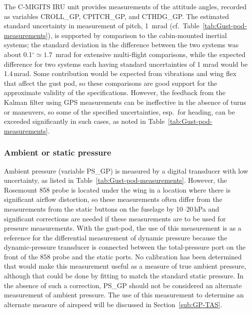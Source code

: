 \documentclass[12pt,twoside,english]{article}\usepackage[]{graphicx}\usepackage[]{color}
\let\OrgIndex\index
\renewcommand*{\index}[1]{\OrgIndex{#1}}
\begin{document}
The C-MIGITS  IRU unit provides measurements of the attitude angles, recorded as variables CROLL\_GP, CPITCH\_GP, and CTHDG\_GP. The estimated standard uncertainty in measurement of pitch, 1~mrad (cf.~Table~\ref{tab:Gust-pod-measurements}), is supported by comparison to the cabin-mounted inertial systems; the standard deviation in the difference between the two systems was about 0.1$^{\circ}\simeq1.7$~mrad for extensive multi-flight comparisons, while the expected difference for two systems each having standard uncertainties of 1 mrad would be 1.4\,mrad. Some contribution would be expected from vibrations and wing flex that affect the gust pod, so these comparisons are good support for the approximate validity of the specifications. However, the feedback from the Kalman filter using GPS measurements can be ineffective in the absence of turns or maneuvers, so some of the specified uncertainties, esp.~for heading, can be exceeded significantly in such cases, as noted in Table~\ref{tab:Gust-pod-measurements}. 


\subsubsection{Ambient or static pressure}

Ambient pressure (variable PS\_GP) is measured by a digital transducer with  low uncertainty, as listed in Table~\ref{tab:Gust-pod-measurements}. However, the Rosemount 858 probe is located under the wing in a location where there is significant airflow distortion, so these measurements often differ from the measurements from the static buttons on the fuselage by 10--20\,hPa and significant corrections are needed if these measurements are to be used for pressure measurements. With the gust-pod, the use of this measurement is as a reference for the differential measurement of dynamic pressure because the dynamic-pressure transducer is connected between the total-pressure port on the front of the 858 probe and the static ports. No calibration has been determined that would make this measurement useful as a measure of true ambient pressure, although that could be done by fitting to match the standard static pressure. In the absence of such a correction, PS\_GP should not be considered an alternate measurement of ambient pressure. The use of this measurement to determine an alternate measure of airspeed will be discussed in Section~\ref{sub:GP-TAS}. 
\end{document}
